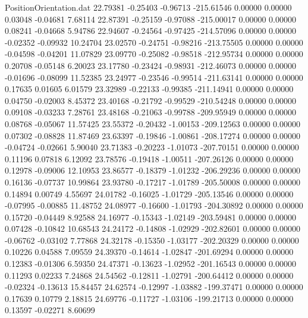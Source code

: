 \begin{filecontents}{PositionOrientation.dat}
  22.79381   -0.25403   -0.96713  -215.61546    0.00000    0.00000    0.03048   -0.04681    7.68114
  22.87391   -0.25159   -0.97088  -215.00017    0.00000    0.00000    0.08241   -0.04668    5.94786
  22.94607   -0.24564   -0.97425  -214.57096    0.00000    0.00000   -0.02352   -0.09932   10.24704
  23.02570   -0.24751   -0.98216  -213.75505    0.00000    0.00000   -0.04598   -0.04201   11.07829
  23.09770   -0.25082   -0.98518  -212.95734    0.00000    0.00000    0.20708   -0.05148    6.20023
  23.17780   -0.23424   -0.98931  -212.46073    0.00000    0.00000   -0.01696   -0.08099   11.52385
  23.24977   -0.23546   -0.99514  -211.63141    0.00000    0.00000    0.17635    0.01605    6.01579
  23.32989   -0.22133   -0.99385  -211.14941    0.00000    0.00000    0.04750   -0.02003    8.45372
  23.40168   -0.21792   -0.99529  -210.54248    0.00000    0.00000    0.09108   -0.03233    7.28761
  23.48168   -0.21063   -0.99788  -209.95949    0.00000    0.00000    0.08768   -0.05067   11.57425
  23.55372   -0.20432   -1.00153  -209.12563    0.00000    0.00000    0.07302   -0.08828   11.87469
  23.63397   -0.19846   -1.00861  -208.17274    0.00000    0.00000   -0.04724   -0.02661    5.90040
  23.71383   -0.20223   -1.01073  -207.70151    0.00000    0.00000    0.11196    0.07818    6.12092
  23.78576   -0.19418   -1.00511  -207.26126    0.00000    0.00000    0.12978   -0.09006   12.10953
  23.86577   -0.18379   -1.01232  -206.29236    0.00000    0.00000    0.16136   -0.07737   10.99864
  23.93780   -0.17217   -1.01789  -205.50008    0.00000    0.00000    0.14894    0.00749    4.55697
  24.01782   -0.16025   -1.01729  -205.13546    0.00000    0.00000   -0.07995   -0.00885   11.48752
  24.08977   -0.16600   -1.01793  -204.30892    0.00000    0.00000    0.15720   -0.04449    8.92588
  24.16977   -0.15343   -1.02149  -203.59481    0.00000    0.00000    0.07428   -0.10842   10.68543
  24.24172   -0.14808   -1.02929  -202.82601    0.00000    0.00000   -0.06762   -0.03102    7.77868
  24.32178   -0.15350   -1.03177  -202.20329    0.00000    0.00000    0.10226    0.04588    7.09559
  24.39370   -0.14614   -1.02847  -201.69294    0.00000    0.00000    0.12383   -0.01306    6.59350
  24.47371   -0.13623   -1.02952  -201.16543    0.00000    0.00000    0.11293    0.02233    7.24868
  24.54562   -0.12811   -1.02791  -200.64412    0.00000    0.00000   -0.02324   -0.13613   15.84457
  24.62574   -0.12997   -1.03882  -199.37471    0.00000    0.00000    0.17639    0.10779    2.18815
  24.69776   -0.11727   -1.03106  -199.21713    0.00000    0.00000    0.13597   -0.02271    8.60699

\end{filecontents}
